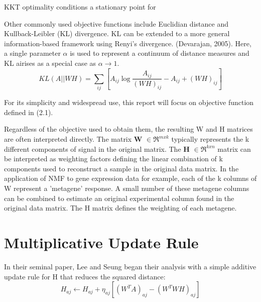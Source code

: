 \documentclass[final,leqno,onefignum,onetabnum]{siamltex1213}
\begin{document}
KKT optimality conditions a stationary point for 




Other commonly used objective functions include Euclidian distance and Kullback-Leibler (KL) divergence. KL can be extended to a more general information-based framework using Renyi's divergence. (Devarajan, 2005). Here, a single parameter $\alpha$ is used to represent a continuum of distance measures and KL airises as a special case as $\alpha \to 1$. 
\begin{equation}\label{ObjKL}
 KL(A || WH) = \sum_{ij}{[A_{ij} \log{ \frac{A_{ij}}{(WH)_{ij}} - A_{ij} + (WH)_{ij}} ]}
\end{equation}


For its simplicity and widespread use, this report will focus on objective function defined in (2.1). 

Regardless of the objective used to obtain them, the resulting W and H matrices are often interpreted directly. The matrix \textbf{W} $ \in \Re^{m x k}$ typically represents the k different components of signal in the original matrix. The \textbf{H} $ \in \Re^{k x n}$ matrix can be interpreted as weighting factors defining the linear combination of k components used to reconstruct a sample in the original data matrix. In the application of NMF to gene expression data for example, each of the k columns of W represent a 'metagene' response. A small number of these metagene columns can be combined to estimate an original experimental column found in the original data matrix. The H matrix defines the weighting of each metagene. 


\section{Multiplicative Update Rule} In their seminal paper, Lee and Seung began their analysis with a simple additive update rule for H that reduces the squared distance: 
\begin{equation}\label{au1}
 H_{aj} \leftarrow  H_{aj} + \eta_{aj} [ (W^T A)_{aj} - (W^T WH)_{aj}]
\end{equation}
\end{document}
